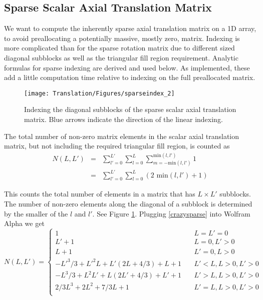 {\footnotesize
{}
}


\clearpage
\subsection{Sparse Scalar Axial Translation Matrix}

We want to compute the inherently sparse axial translation matrix on a 1D array, to avoid preallocating a potentially massive, mostly zero, matrix. Indexing is more complicated than for the sparse rotation matrix due to different sized diagonal subblocks as well as the triangular fill region requirement. Analytic formulas for sparse indexing are derived and used below. As implemented, these add a little computation time relative to indexing on the full preallocated matrix. 

\begin{figure}[H] 
  \centering
 \texttt{[image: Translation/Figures/sparseindex\_2]} 
   \caption{Indexing the diagonal subblocks of the sparse scalar axial translation matrix. Blue arrows indicate the direction of the linear indexing.  }
   \label{fig2translation}
\end{figure}


The total number of non-zero matrix elements in the scalar axial translation matrix, but not including the required triangular fill region, is counted as 
\begin{eqnarray}
N(L,L') &=& \sum_{l' = 0}^{L'} \sum_{l=0}^{L} \sum_{m = -\textrm{min}(l,l')}^{\textrm{min}(l,l')} 1 \label{eq:NLL}\\
\ & = & \sum_{l' = 0}^{L'} \sum_{l=0}^{L} \left( \textrm{2 min}(l,l') + 1 \right) \label{crazysparse}
\end{eqnarray}  

This counts the total number of elements in a matrix that has $L \times L'$ subblocks. The number of non-zero elements along the diagonal of a subblock is determined by the smaller of the $l$ and $l'$. See Figure \ref{fig2translation}.  Plugging \eqref{crazysparse} into Wolfram Alpha we get
\begin{equation}
N(L,L') 
= \left\{
\begin{array}{ccc}
1 & \ & L =  L' = 0 \\
L'+1 &\ & L = 0, L' >0\\
L + 1 & \ & L' = 0 , L>0\\
-L'^3/3+L'^2 L+L' (2 L+4/3)+L+1 & \ & L'<L, L>0,L'>0 \\
-L^3/3+L^2 L'+L (2 L'+4/3)+L'+1 & \ & L'>L, L>0,L'>0 \\
2/3L^3 + 2L^2 + 7/3L + 1 & \ & L' = L, L>0,L'>0 \\
\end{array}
\right.
 \label{eq:a1}
\end{equation}

